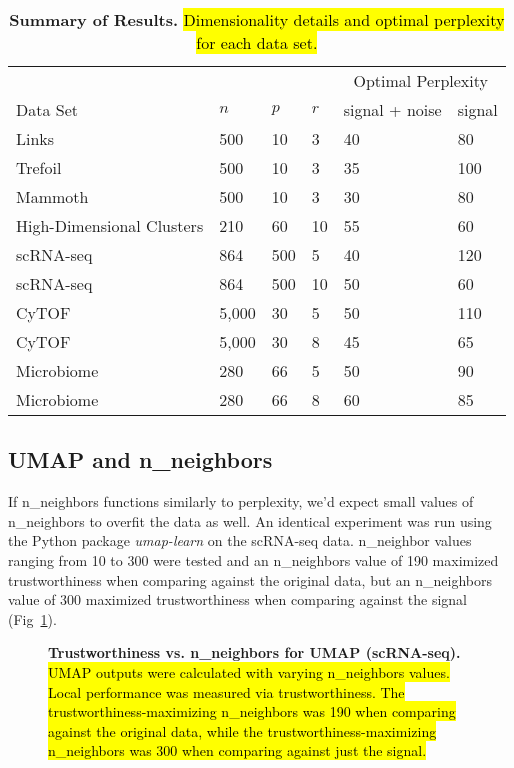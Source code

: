 \documentclass[10pt,letterpaper]{article}
\begin{document}
\begin{table}[!ht]
\centering
\caption{{\bf Summary of Results.}
\hl{Dimensionality details and optimal perplexity for each data set.}}
\begin{tabular}{@{}llllll@{}}
\toprule 
 & & & & \multicolumn{2}{c}{Optimal Perplexity} \\
\cmidrule{5-6}
Data Set & $n$ & $p$ & $r$ & signal + noise & signal \\
\midrule 
Links \cite{Distill} & 500 & 10 & 3 & 40 & 80 \\
Trefoil \cite{Distill} & 500 & 10 & 3 & 35 & 100 \\
Mammoth \cite{understanding DR} & 500 & 10 & 3 & 30 & 80 \\
High-Dimensional Clusters & 210 & 60 & 10 & 55 & 60 \\
scRNA-seq \cite{scRNA data} & 864 & 500 & 5 & 40 & 120 \\
scRNA-seq \cite{scRNA data} & 864 & 500 & 10 & 50 & 60 \\
CyTOF \cite{CyTOF data} & 5,000 & 30 & 5 & 50 & 110 \\
CyTOF \cite{CyTOF data} & 5,000 & 30 & 8 & 45 & 65 \\
Microbiome \cite{enterotype data} & 280 & 66 & 5 & 50 & 90 \\
Microbiome \cite{enterotype data} & 280 & 66 & 8 & 60 & 85 \\
\bottomrule
\end{tabular}
\end{table}

\subsection*{UMAP and n\_neighbors}
If n\_neighbors functions similarly to perplexity, we'd expect small values of n\_neighbors to overfit the data as well. An identical experiment was run using the Python package \textit{umap-learn} \cite{umap} on the scRNA-seq data. n\_neighbor values ranging from 10 to 300 were tested and an n\_neighbors value of 190 maximized trustworthiness when comparing against the original data, but an n\_neighbors value of 300 maximized trustworthiness when comparing against the signal (Fig~\ref{fig14}).

\begin{figure}[!h]
\caption{{\bf Trustworthiness vs. n\_neighbors for UMAP (scRNA-seq).}
\hl{UMAP outputs were calculated with varying n\_neighbors values. Local performance was measured via trustworthiness. The trustworthiness-maximizing n\_neighbors was 190 when comparing against the original data, while the trustworthiness-maximizing n\_neighbors was 300 when comparing against just the signal.}
\label{fig14}}
\end{figure}
\end{document}
